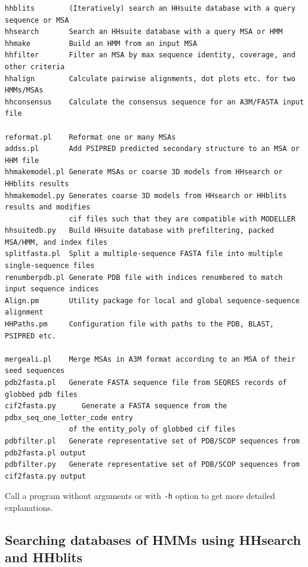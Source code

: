 \documentclass[11pt,a4paper]{article}
\begin{document}
\small 
\begin{verbatim}
hhblits        (Iteratively) search an HHsuite database with a query sequence or MSA
hhsearch       Search an HHsuite database with a query MSA or HMM
hhmake         Build an HMM from an input MSA 
hhfilter       Filter an MSA by max sequence identity, coverage, and other criteria
hhalign        Calculate pairwise alignments, dot plots etc. for two HMMs/MSAs
hhconsensus    Calculate the consensus sequence for an A3M/FASTA input file

reformat.pl    Reformat one or many MSAs
addss.pl       Add PSIPRED predicted secondary structure to an MSA or HHM file
hhmakemodel.pl Generate MSAs or coarse 3D models from HHsearch or HHblits results	
hhmakemodel.py Generates coarse 3D models from HHsearch or HHblits results and modifies 
               cif files such that they are compatible with MODELLER
hhsuitedb.py   Build HHsuite database with prefiltering, packed MSA/HMM, and index files
splitfasta.pl  Split a multiple-sequence FASTA file into multiple single-sequence files
renumberpdb.pl Generate PDB file with indices renumbered to match input sequence indices
Align.pm       Utility package for local and global sequence-sequence alignment
HHPaths.pm     Configuration file with paths to the PDB, BLAST, PSIPRED etc.

mergeali.pl    Merge MSAs in A3M format according to an MSA of their seed sequences
pdb2fasta.pl   Generate FASTA sequence file from SEQRES records of globbed pdb files
cif2fasta.py	  Generate a FASTA sequence from the pdbx_seq_one_letter_code entry 
               of the entity_poly of globbed cif files
pdbfilter.pl   Generate representative set of PDB/SCOP sequences from pdb2fasta.pl output
pdbfilter.py   Generate representative set of PDB/SCOP sequences from cif2fasta.py output
\end{verbatim} 
\normalsize


Call a program without arguments or with \verb`-h` option to get more detailed explanations.


\subsection{Searching databases of HMMs using HHsearch and HHblits}\label{searching_hm_dbs}
\end{document}
